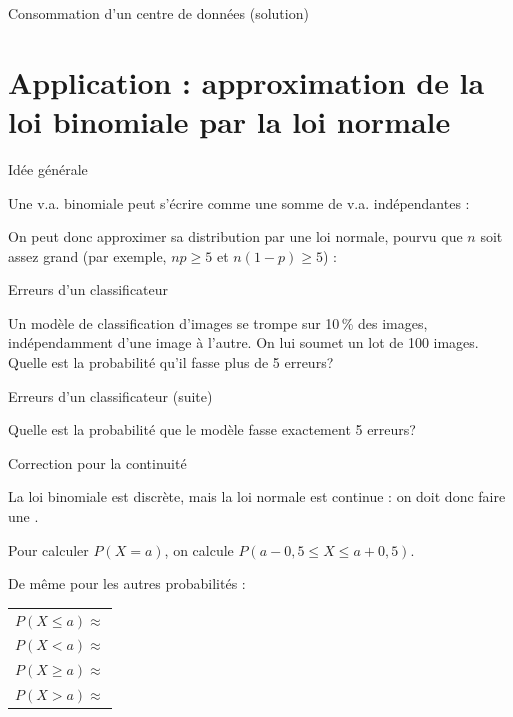 \documentclass{BeamerTemplate}
\newcommand{\cibleReponse}{}
\newcommand{\lienreponse}[1]{\gdef\cibleReponse{#1}}
\begin{document}
\begin{frame}[t]{Consommation d'un centre de données (solution)}

\lienreponse{rep-ex3}
\end{frame}

\section{Application : approximation de la loi binomiale par la loi normale}

\begin{frame}[t]{Idée générale}

Une v.a. binomiale peut s'écrire comme une somme de v.a. indépendantes :
\vspace{1in}

On peut donc approximer sa distribution par une loi normale, pourvu que $n$
soit assez grand (par exemple, $np\ge 5$ et $n(1-p)\ge 5$) :

\end{frame}


\begin{frame}[t,label=exclassif]{Erreurs d'un classificateur}

Un modèle de classification d'images se trompe sur 10\,\% des images, indépendamment d'une
image à l'autre. On lui soumet un lot de 100 images. Quelle est la probabilité qu'il fasse plus
de 5 erreurs?

\lienreponse{rep-ex3}
\end{frame}


\begin{frame}[t]{Erreurs d'un classificateur (suite)}

Quelle est la probabilité que le modèle fasse exactement 5 erreurs?

\lienreponse{rep-ex3}
\end{frame}


\begin{frame}[t]{Correction pour la continuité}

La loi binomiale est discrète, mais la loi normale est continue : on doit donc faire une
.

\vspace{0.2in}
Pour calculer $P(X=a)$, on calcule $P(a-0{,}5 \leq X \leq a+0{,}5)$.

\vspace{0.2in}
De même pour les autres probabilités :

\vspace{0.05in}
\begin{center}
\begin{tabular}{l}
$P(X \leq a) \approx$ \\[14pt]
$P(X < a) \approx$ \\[14pt]
$P(X \geq a) \approx$ \\[14pt]
$P(X > a) \approx$
\end{tabular}
\end{center}

\end{frame}
\end{document}
